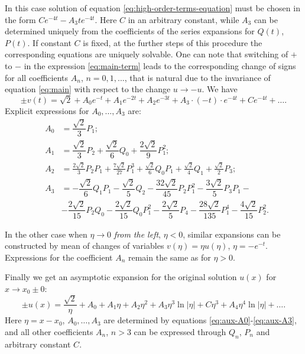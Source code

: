 In this case solution of equation \eqref{eq:high-order-terms-equation} must be chosen in the form $Ce^{-4t} - A_3 t e^{-4t}$.
Here $C$ in an arbitrary constant, while $A_3$ can be determined uniquely from the coefficients of the series expansions for $Q(t)$, $P(t)$.
If constant $C$ is fixed, at the further steps of this procedure the corresponding equations are uniquely solvable.
One can note that switching of $+$ to $-$ in the expression \eqref{eq:main-term} leads to the corresponding change of signs for all coefficients $A_n$, $n = 0, 1,...$, that is natural due to the invariance of equation \eqref{eq:main} with respect to the change $u \to -u$.
We have
\begin{equation}
	\pm v(t) = \sqrt{2} + A_0 e^{-t} + A_1 e^{-2t} + A_2 e^{-3t} + A_3 \cdot (-t) \cdot e^{-4t} + C e^{-4t} + \dots.
	\label{eq:expansion-intermediate}
\end{equation}
Explicit expressions for $A_0, \dots, A_3$ are:
\begin{eqnarray}
	& A_0 & = \dfrac{\sqrt{2}}{3} P_1; \label{eq:aux-A0} \\
	& A_1 & = \dfrac{\sqrt{2}}{3} P_2 + \dfrac{\sqrt{2}}{6} Q_0 + \dfrac{2 \sqrt{2}}{9} P_1^2; \label{eq:aux-A1} \\
	& A_2 & = \frac{2\sqrt{2}} 3P_2 P_1 + \frac{7\sqrt{2}}{27} P_1^3 + \frac{\sqrt{2}} 6Q_0 P_1 + \frac{\sqrt{2}} 4Q_1 + \frac{\sqrt{2}} 2P_3; \label{eq:aux-A2} \\
	& A_3 & = -\dfrac{\sqrt{2}}{6} Q_1 P_1 - \dfrac{\sqrt{2}}{5} Q_2 - \dfrac{32 \sqrt{2}}{45} P_2 P_1^2 - \dfrac{3 \sqrt{2}}{5} P_3 P_1 - \\
	&& - \dfrac{2 \sqrt{2}}{15} P_2 Q_0 -\dfrac{2 \sqrt{2}}{15} Q_0 P_1^2 - \dfrac{2 \sqrt{2}}{5} P_4 - \dfrac{28 \sqrt{2}}{135} P_1^4 - \dfrac{4 \sqrt{2}}{15} P_2^2. \label{eq:aux-A3}
\end{eqnarray}

In the other case when $\eta \to 0$ {\it from the left}, $\eta < 0$, similar expansions can be constructed by mean of changes of variables $v(\eta) = \eta u(\eta)$, $\eta = -e^{-t}$.
Expressions for the coefficient $A_n$ remain the same as for $\eta > 0$.

Finally we get an asymptotic expansion for the original solution $u(x)$ for $x \to x_0 \pm 0$:
\begin{equation}
	\pm u(x) = \dfrac{\sqrt{2}}{\eta} + A_0 + A_1 \eta + A_2 \eta^2 + A_3 \eta^3 \ln |\eta| + C \eta^3+ A_4 \eta^4 \ln |\eta| + \dots.
	\label{eq:expansion}
\end{equation}
Here $\eta = x - x_0$, $A_0, \dots, A_3$ are determined by equations \eqref{eq:aux-A0}-\eqref{eq:aux-A3}, and all other coefficients $A_n$, $n > 3$ can be expressed through $Q_n$, $P_n$ and arbitrary constant $C$.

